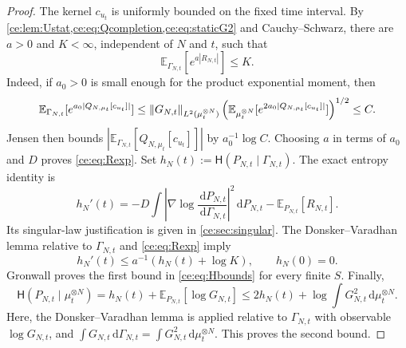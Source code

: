 \documentclass[11pt,reqno]{amsart}
\numberwithin{equation}{section}
\theoremstyle{plain}
\theoremstyle{remark}
\DeclarePairedDelimiter{\norm}{\lVert}{\rVert}
\newcommand{\E}{\mathbb E}\newcommand{\Q}{\mathbb Q}\newcommand{\Pb}{\mathbb P}
\newcommand{\Hr}{\mathsf H}\newcommand{\dd}{\,\mathrm d}
\begin{document}
\begin{proof}
The kernel $c_{u_t}$ is uniformly bounded on the fixed time interval. By \cref{ce:lem:Ustat,ce:eq:Qcompletion,ce:eq:staticG2} and Cauchy--Schwarz, there are $a>0$ and $K<\infty$, independent of $N$ and $t$, such that
\begin{equation}\label{ce:eq:Rexp}
 \E_{\Gamma_{N,t}}[e^{a|R_{N,t}|}]\le K.
\end{equation}
Indeed, if $a_0>0$ is small enough for the product exponential moment, then
\begin{equation}\label{ce:eq:commutator-Gibbs-transfer}
 \E_{\Gamma_{N,t}}[e^{a_0|Q_{N,\mu_t}[c_{u_t}]|}]
 \le\norm{G_{N,t}}_{L^2(\mu_t^{\otimes N})}
 \left(\E_{\mu_t^{\otimes N}}[e^{2a_0|Q_{N,\mu_t}[c_{u_t}]|}]\right)^{1/2}\le C.
\end{equation}
Jensen then bounds $|\E_{\Gamma_{N,t}}[Q_{N,\mu_t}[c_{u_t}]]|$ by $a_0^{-1}\log C$. Choosing $a$ in terms of $a_0$ and $D$ proves \eqref{ce:eq:Rexp}. Set $h_N(t):=\Hr(P_{N,t}\mid\Gamma_{N,t})$. The exact entropy identity is
\begin{equation}\label{ce:eq:entropyidentity}
 h_N'(t)=-D\int\left|\nabla\log\frac{\dd P_{N,t}}{\dd\Gamma_{N,t}}\right|^2\dd P_{N,t}
 -\E_{P_{N,t}}[R_{N,t}].
\end{equation}
Its singular-law justification is given in \cref{ce:sec:singular}. The Donsker--Varadhan lemma relative to $\Gamma_{N,t}$ and \eqref{ce:eq:Rexp} imply
\begin{equation}\label{ce:eq:entropygronwall}
 h_N'(t)\le a^{-1}(h_N(t)+\log K),\qquad h_N(0)=0.
\end{equation}
Gronwall proves the first bound in \eqref{ce:eq:Hbounds} for every finite $S$. Finally,
\begin{equation}\label{ce:eq:Hproduct}
 \Hr(P_{N,t}\mid\mu_t^{\otimes N})
 =h_N(t)+\E_{P_{N,t}}[\log G_{N,t}]
 \le2h_N(t)+\log\int G_{N,t}^2\dd\mu_t^{\otimes N}.
\end{equation}
Here, the Donsker--Varadhan lemma is applied relative to $\Gamma_{N,t}$ with observable $\log G_{N,t}$, and $\int G_{N,t}\dd\Gamma_{N,t}=\int G_{N,t}^2\dd\mu_t^{\otimes N}$. This proves the second bound.
\end{proof}
\end{document}
